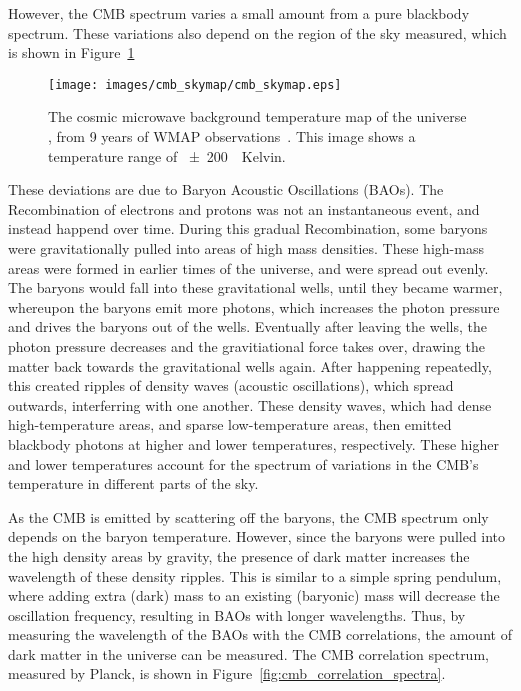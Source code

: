     However, the CMB spectrum varies a small amount from a pure blackbody spectrum.
    These variations also depend on the region of the sky measured, which is shown in Figure~\ref{fig:cmb}

    \begin{figure}[ht]
      \centering
      \texttt{[image: images/cmb\_skymap/cmb\_skymap.eps]}
      \caption[Cosmic Microwave Background Skymap]{
        The cosmic microwave background temperature map of the universe \cite{wmap_skymap}, from 9 years of WMAP observations~\cite{wmap9year}.
        This image shows a temperature range of \SI{\pm200}{\mu{}Kelvin}.
      }
      \label{fig:cmb}
    \end{figure}

    These deviations are due to Baryon Acoustic Oscillations (BAOs).
    The Recombination of electrons and protons was not an instantaneous event, and instead happend over time.
    During this gradual Recombination, some baryons were gravitationally pulled into areas of high mass densities.
    These high-mass areas were formed in earlier times of the universe, and were spread out evenly.
    The baryons would fall into these gravitational wells, until they became warmer, whereupon the baryons emit more photons, which increases the photon pressure and drives the baryons out of the wells.
    Eventually after leaving the wells, the photon pressure decreases and the gravitiational force takes over, drawing the matter back towards the gravitational wells again.
    After happening repeatedly, this created ripples of density waves (acoustic oscillations), which spread outwards, interferring with one another.
    These density waves, which had dense high-temperature areas, and sparse low-temperature areas, then emitted blackbody photons at higher and lower temperatures, respectively.
    These higher and lower temperatures account for the spectrum of variations in the CMB's temperature in different parts of the sky.
    
    As the CMB is emitted by scattering off the baryons, the CMB spectrum only depends on the baryon temperature.
    However, since the baryons were pulled into the high density areas by gravity, the presence of dark matter increases the wavelength of these density ripples.
    This is similar to a simple spring pendulum, where adding extra (dark) mass to an existing (baryonic) mass will decrease the oscillation frequency, resulting in BAOs with longer wavelengths.
    Thus, by measuring the wavelength of the BAOs with the CMB correlations, the amount of dark matter in the universe can be measured.
    The CMB correlation spectrum, measured by Planck, is shown in Figure~\ref{fig:cmb_correlation_spectra}.
    
